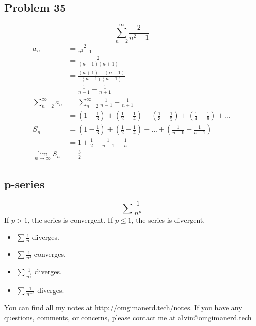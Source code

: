 \documentclass{math}
\begin{document}
\subsection*{Problem 35}
\[ \sum_{n=2}^{\infty}\frac{2}{n^{2}-1} \]
\begin{align*}
  a_{n} &= \frac{2}{n^{2}-1} \\
  &= \frac{2}{(n-1)(n+1)} \\
  &= \frac{(n+1)-(n-1)}{(n-1)(n+1)} \\
  &= \frac{1}{n-1}-\frac{1}{n+1} \\
  \sum_{n=2}^{\infty}a_{n} &= \sum_{n=2}^{\infty}\frac{1}{n-1}-\frac{1}{n+1} \\
  &= (1-\frac{1}{3})+(\frac{1}{2}-\frac{1}{4})+(\frac{1}{3}-\frac{1}{5})+
    (\frac{1}{4}-\frac{1}{6})+... \\
  S_{n} &= (1-\frac{1}{3})+(\frac{1}{2}-\frac{1}{4})+...+
    (\frac{1}{n-1}-\frac{1}{n+1}) \\
  &= 1+\frac{1}{2}-\frac{1}{n-1}-\frac{1}{n} \\
  \lim_{n\to\infty}S_{n} &= \frac{3}{2}
\end{align*}

\subsection*{p-series}
\[ \sum\frac{1}{n^{p}} \]
If \( p > 1 \), the series is convergent. If \( p \leq 1 \), the series is
divergent.
\begin{itemize}
  \item \( \sum\frac{1}{n} \) diverges.
  \item \( \sum\frac{1}{n^{2}} \) converges.
  \item \( \sum\frac{1}{n^{\frac{1}{3}}} \) diverges.
  \item \( \sum\frac{1}{n^{-2}} \) diverges.
\end{itemize}

\begin{center}
  You can find all my notes at \url{http://omgimanerd.tech/notes}. If you have
  any questions, comments, or concerns, please contact me at
  alvin@omgimanerd.tech
\end{center}
\end{document}
